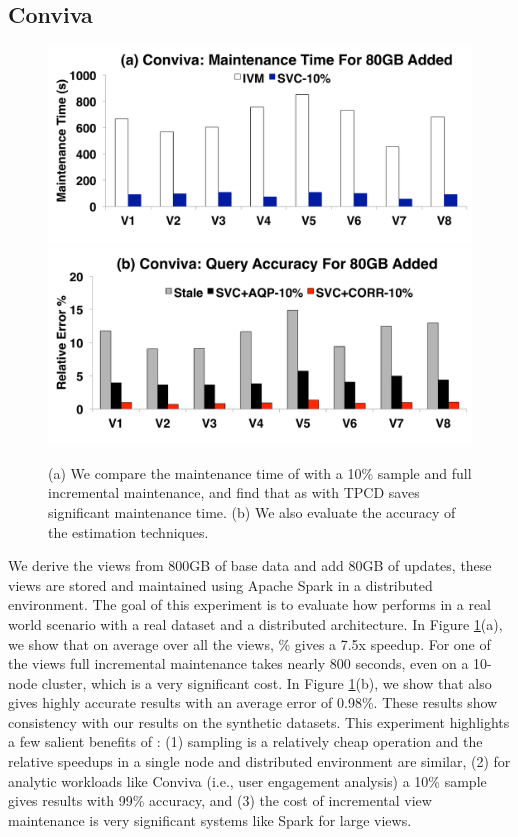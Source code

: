 \subsection{Conviva}
\begin{figure}[t]
\centering
 \includegraphics[scale=0.14]{exp/con_3.pdf}
 \includegraphics[scale=0.14]{exp/con_4.pdf} \vspace{-1.5em}
 \caption{(a) We compare the maintenance time of \svc with a 10\% sample and full incremental maintenance, and find that as with TPCD \svc saves significant maintenance time. (b) We also evaluate the accuracy of the estimation techniques. \label{conv-1}}\vspace{-1.5em}
\end{figure}
We derive the views from 800GB of base data and add 80GB of updates, these views are stored and maintained using Apache Spark in a distributed environment.
The goal of this experiment is to evaluate how \svc performs in a real world scenario with a real dataset and a distributed architecture.
In Figure \ref{conv-1}(a), we show that on average over all the views, \% gives a 7.5x speedup.
For one of the views full incremental maintenance takes nearly 800 seconds, even on a 10-node cluster, which is a very significant cost.
In Figure \ref{conv-1}(b), we show that \svc also gives highly accurate results with an average error of 0.98\%.
These results show consistency with our results on the synthetic datasets.
This experiment highlights a few salient benefits of \svc: (1) sampling is a relatively cheap operation and the relative speedups in a single node and distributed environment are similar, (2) for analytic workloads like Conviva (i.e., user engagement analysis) a 10\% sample gives results with 99\% accuracy, and (3) the cost of incremental view maintenance is very significant systems like Spark for large views.

